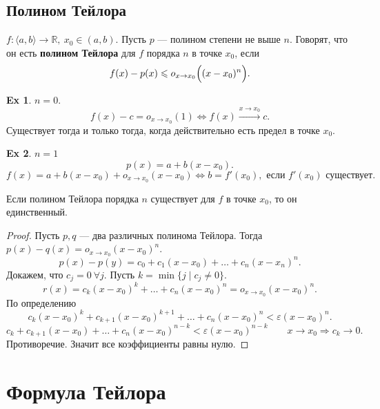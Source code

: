 \documentclass[11pt]{book}
\newcommand{\R}{\mathbb{R}}
\renewcommand{\le}{\leqslant}
\theoremstyle{definition}
\theoremstyle{plain}
\theoremstyle{plain}
\theoremstyle{definition}
\newtheorem*{ex}{Ex}
\theoremstyle{remark}
\begin{document}
\subsection{Полином Тейлора}
\begin{defn}
    $ f: \langle a, b \rangle \to \R, ~ x_0 \in (a, b)$. Пусть $ p$ --- полином степени не выше  $ n$. Говорят, что он есть  {\bf полином Тейлора} для $ f$ порядка  $ n$ в точке  $ x_0$, если \[
	f(x) - p(x) \le o_{x \to  x_0}\Bigl((x - x_{0})^{n}\Bigr)
    .\] 
\end{defn}
\begin{ex}
    $ n = 0$. 
    \[
	f(x) -c = o_{x \to  x_0}(1) \Longleftrightarrow f(x) \stackrel{x \to  x_0} \longrightarrow c
    .\] 
    Существует тогда и только тогда, когда действительно есть предел в точке $ x_0$.
\end{ex}
\begin{ex}
    $ n = 1$
     \[
	 p(x) = a + b(x-x_0)
    .\] 
    \[
	f(x) = a + b(x-x_0) + o_{x \to  x_0}(x-x_0) \Longleftrightarrow b = f'(x_0), \text{ если } f'(x_0) \text{ существует}
    .\] 
\end{ex}
\begin{thm}
    Если полином Тейлора порядка $ n$ существует для $ f$ в точке $ x_0$, то он единственный.
\end{thm}
\begin{proof}
    Пусть $ p, q$ --- два различных полинома Тейлора. Тогда $ p(x) - q(x) = o_{x \to  x_0}(x-x_{0})^{n}$.
    \[
	p(x) - p(y) = c_0 + c_1(x-x_0) + \ldots + c_n(x-x_{n})^{n}
    .\] 
    Докажем, что $ c_j = 0 ~ \forall j$.
    Пусть $ k = \min \{j\mid c_j \ne 0 \}$.
    \[
	r(x) = c_k(x-x_0)^{k} + \ldots + c_n(x-x_0)^{n} = o_{x \to  x_0}(x-x_0)^{n}
    .\] 
    По определению
    \[
	c_k(x-x_0)^{k} + c_{k+1}(x-x_0)^{k+1} + \ldots + c_n(x-x_0)^{n} < \varepsilon (x-x_0)^{n}
    .\] 
    \[
	c_k + c_{k+1} (x-x_0) + \ldots + c_n (x-x_0)^{n-k} < \varepsilon (x-x_0)^{n-k} \qquad x \to  x_0 \Longrightarrow c_k \to 0
    .\] 
    Противоречие. Значит все коэффициенты равны нулю.
\end{proof}
\section{Формула Тейлора}
\end{document}
